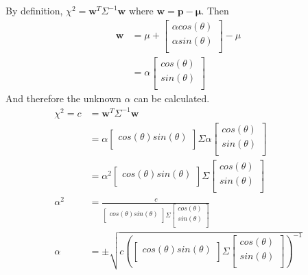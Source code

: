 \documentclass[12pt]{article}
\begin{document}
By definition, $\chi^2 = \mathbf{w}^T \Sigma^{-1} \mathbf{w}$ where $\mathbf{w} = \mathbf{p}-\mathbf{\mu}$.  Then 
\begin{align*}
\mathbf{w} &= \mu +
	\left[ {\begin{smallmatrix}
	\alpha cos(\theta)  \\
	\alpha sin(\theta)  \\
 	\end{smallmatrix} } \right] 
	- \mu \\
 &= \alpha \left[ {\begin{smallmatrix}
	cos(\theta)  \\
	sin(\theta)  \\
	 \end{smallmatrix} } \right]
\end{align*}
And therefore the unknown $\alpha$ can be calculated.
\begin{align*}
\chi^2 = c &=  \mathbf{w}^T \Sigma^{-1} \mathbf{w} \\
&=  \alpha \left[ {\begin{smallmatrix}
	cos(\theta)  sin(\theta)  \\
	 \end{smallmatrix} } \right]
 	\Sigma
 	\alpha \left[ {\begin{smallmatrix}
	cos(\theta)  \\
	sin(\theta)  \\
	 \end{smallmatrix} } \right] \\
&= \alpha^2 \left[ {\begin{smallmatrix}
	cos(\theta)  sin(\theta)  \\
	 \end{smallmatrix} } \right]
 	\Sigma
 	\left[ {\begin{smallmatrix}
	cos(\theta)  \\
	sin(\theta)  \\
	 \end{smallmatrix} } \right] \\
\alpha^2 &= \frac{c}{\left[ {\begin{smallmatrix}
	cos(\theta)  sin(\theta)  \\
	 \end{smallmatrix} } \right]
 	\Sigma
 	\left[ {\begin{smallmatrix}
	cos(\theta)  \\
	sin(\theta)  \\
	 \end{smallmatrix} } \right]} \\
\alpha &=\pm\sqrt{ c \left( \left[ {\begin{smallmatrix}
	cos(\theta)  sin(\theta)  \\
	 \end{smallmatrix} } \right]
 	\Sigma
 	\left[ {\begin{smallmatrix}
	cos(\theta)  \\
	sin(\theta)  \\
	 \end{smallmatrix} } \right]
	 \right)^{-1}}
\end{align*}
\end{document}
